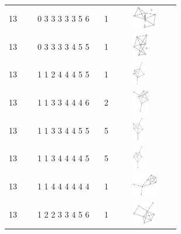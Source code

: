 \begin{table}[h!]
\begin{tabular}{m{0.15\linewidth} m{0.35\linewidth} m{0.15\linewidth} m{0.25\linewidth}}
13 & 0 3 3 3 3 3 5 6 & 1 & \includegraphics[height=1cm]{15-universal-graphs/img/degree-sequences-example-graphs/graph-4-8-31}\\
13 & 0 3 3 3 3 4 5 5 & 1 & \includegraphics[height=1cm]{15-universal-graphs/img/degree-sequences-example-graphs/graph-4-8-32}\\
13 & 1 1 2 4 4 4 5 5 & 1 & \includegraphics[height=1cm]{15-universal-graphs/img/degree-sequences-example-graphs/graph-4-8-33}\\
13 & 1 1 3 3 4 4 4 6 & 2 & \includegraphics[height=1cm]{15-universal-graphs/img/degree-sequences-example-graphs/graph-4-8-34}\\
13 & 1 1 3 3 4 4 5 5 & 5 & \includegraphics[height=1cm]{15-universal-graphs/img/degree-sequences-example-graphs/graph-4-8-35}\\
13 & 1 1 3 4 4 4 4 5 & 5 & \includegraphics[height=1cm]{15-universal-graphs/img/degree-sequences-example-graphs/graph-4-8-36}\\
13 & 1 1 4 4 4 4 4 4 & 1 & \includegraphics[height=1cm]{15-universal-graphs/img/degree-sequences-example-graphs/graph-4-8-37}\\
13 & 1 2 2 3 3 4 5 6 & 1 & \includegraphics[height=1cm]{15-universal-graphs/img/degree-sequences-example-graphs/graph-4-8-38}\\

\end{tabular}
\end{table}
